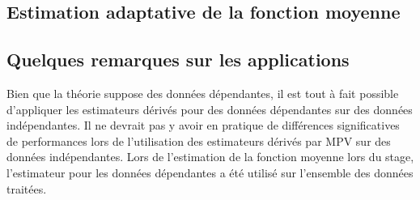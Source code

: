 

\subsection{Estimation adaptative de la fonction moyenne}




% 
% 

\subsection{Quelques remarques sur les applications}

Bien que la théorie suppose des données dépendantes, il est tout à fait possible d'appliquer les estimateurs dérivés pour des données dépendantes sur des données indépendantes. Il ne devrait pas y avoir en pratique de différences significatives de performances lors de l'utilisation des estimateurs dérivés par MPV sur des données indépendantes. Lors de l'estimation de la fonction moyenne lors du stage, l'estimateur pour les données dépendantes a été utilisé sur l'ensemble des données traitées.
